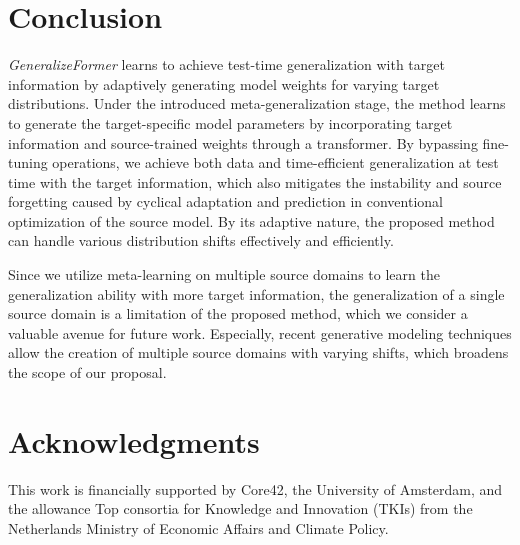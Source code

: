 \section{Conclusion}
\textit{GeneralizeFormer} learns to achieve test-time generalization with target information by adaptively generating model weights for varying target distributions. Under the introduced meta-generalization stage, the method learns to generate the target-specific model parameters by incorporating target information and source-trained weights through a transformer. By bypassing fine-tuning operations, we achieve both data and time-efficient generalization at test time with the target information, which also mitigates the instability and source forgetting caused by cyclical adaptation and prediction in conventional optimization of the source model. By its adaptive nature, the proposed method can handle various distribution shifts effectively and efficiently. 

\noindent Since we utilize meta-learning on multiple source domains to learn the generalization ability with more target information, the generalization of a single source domain is a limitation of the proposed method, which we consider a valuable avenue for future work. Especially, recent generative modeling techniques allow the creation of multiple source domains with varying shifts, which broadens the scope of our proposal.

\section*{Acknowledgments}
\noindent This work is financially supported by Core42, the University of Amsterdam, and the allowance Top consortia for Knowledge and Innovation (TKIs) from the Netherlands Ministry of Economic Affairs and Climate Policy.
